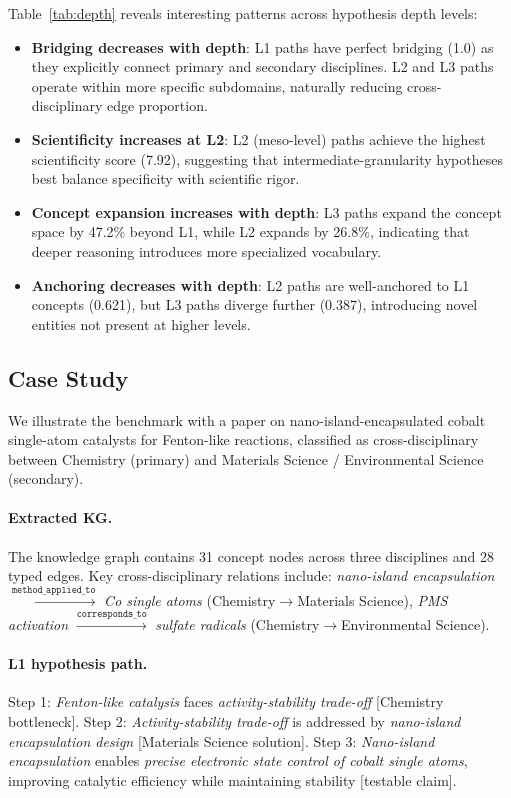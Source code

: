 \documentclass{article}
\begin{document}
Table~\ref{tab:depth} reveals interesting patterns across hypothesis depth levels:

\begin{itemize}[leftmargin=*,topsep=1pt,itemsep=1pt]
\item \textbf{Bridging decreases with depth}: L1 paths have perfect bridging (1.0) as they explicitly connect primary and secondary disciplines. L2 and L3 paths operate within more specific subdomains, naturally reducing cross-disciplinary edge proportion.
\item \textbf{Scientificity increases at L2}: L2 (meso-level) paths achieve the highest scientificity score (7.92), suggesting that intermediate-granularity hypotheses best balance specificity with scientific rigor.
\item \textbf{Concept expansion increases with depth}: L3 paths expand the concept space by 47.2\% beyond L1, while L2 expands by 26.8\%, indicating that deeper reasoning introduces more specialized vocabulary.
\item \textbf{Anchoring decreases with depth}: L2 paths are well-anchored to L1 concepts (0.621), but L3 paths diverge further (0.387), introducing novel entities not present at higher levels.
\end{itemize}

\subsection{Case Study}
\label{sec:case}

We illustrate the benchmark with a paper on nano-island-encapsulated cobalt single-atom catalysts for Fenton-like reactions, classified as cross-disciplinary between Chemistry (primary) and Materials Science / Environmental Science (secondary).

\paragraph{Extracted KG.}
The knowledge graph contains 31 concept nodes across three disciplines and 28 typed edges.
Key cross-disciplinary relations include:
\emph{nano-island encapsulation} $\xrightarrow{\texttt{method\_applied\_to}}$ \emph{Co single atoms} (Chemistry$\to$Materials Science),
\emph{PMS activation} $\xrightarrow{\texttt{corresponds\_to}}$ \emph{sulfate radicals} (Chemistry$\to$Environmental Science).

\paragraph{L1 hypothesis path.}
Step 1: \emph{Fenton-like catalysis} faces \emph{activity-stability trade-off} [Chemistry bottleneck].
Step 2: \emph{Activity-stability trade-off} is addressed by \emph{nano-island encapsulation design} [Materials Science solution].
Step 3: \emph{Nano-island encapsulation} enables \emph{precise electronic state control of cobalt single atoms}, improving catalytic efficiency while maintaining stability [testable claim].
\end{document}
